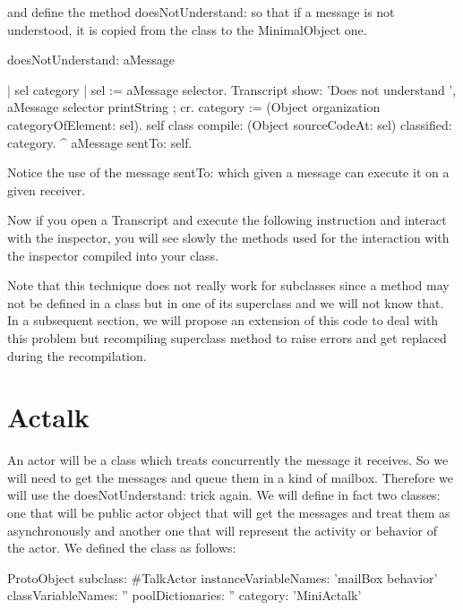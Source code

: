 \documentclass[a4paper,10pt,twoside]{book}
\begin{document}
and define the method doesNotUnderstand: so that if a message is not understood, it is copied from the class 
to the MinimalObject one. 

\begin{code}{}
doesNotUnderstand: aMessage

	| sel category |
	sel := aMessage selector. 
	Transcript show: 'Does not understand ',  aMessage selector printString ; cr.
	category := (Object organization categoryOfElement: sel).
	self class compile: (Object sourceCodeAt: sel) classified: category.
	^ aMessage sentTo: self.
\end{code}


Notice the use of the message sentTo: which given a message can execute it on a given receiver. 

Now if you open a Transcript and execute the following instruction 
and interact with the inspector, you will see slowly the methods used for the interaction with the inspector
compiled into your class. 

Note that this technique does not really work for subclasses since a method may not be defined in a class
but in one of its superclass and we will not know that.
In a subsequent section, we will propose an extension of this code to deal with this problem but recompiling superclass method to raise
errors and get replaced during the recompilation.


\section{}


\section{Actalk}


An actor will be a class which treats concurrently the message it receives. So we will need to get the messages and queue them in a kind of mailbox. Therefore we will use the doesNotUnderstand: trick again. We will define in fact two classes: one that will be public actor object that will get the messages and treat them as asynchronously and another one that will represent the activity or behavior of the actor.
 We defined the class  as follows:



\begin{classdef}{}
ProtoObject subclass: #TalkActor
	instanceVariableNames: 'mailBox behavior'
	classVariableNames: ''
	poolDictionaries: ''
	category: 'MiniActalk'
\end{classdef}
\end{document}
